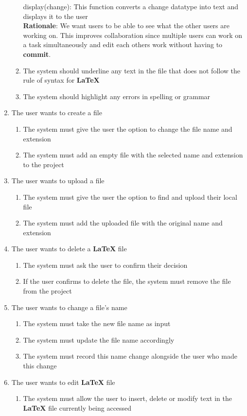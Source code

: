 \documentclass[12pt, titlepage]{article}
\begin{document}
\begin{enumerate}[{BE}1.]
\begin{enumerate}[resume*]
			display(change): This function converts a change datatype into text and displays it to the user\\
			\textbf{Rationale}: We want users to be able to see what the other users are working on. This improves collaboration since multiple users can work on a task simultaneously and edit each others work without having to \textbf{commit}.
			\item The system should underline any text in the file that does not follow the rule of syntax for \textbf{LaTeX}
			\item The system should highlight any errors in spelling or grammar
		\end{enumerate}
		\item The user wants to create a file
		\begin{enumerate}[resume*]\addtocounter{enumii}{1}
			\item The system must give the user the option to change the file name and extension
			\item The system must add an empty file with the selected name and extension to the project
		\end{enumerate}
		\item The user wants to upload a file
		\begin{enumerate}[resume*]
			\item The system must give the user the option to find and upload their local file
			\item The system must add the uploaded file with the original name and extension
		\end{enumerate}
		\item The user wants to delete a \textbf{LaTeX} file
		\begin{enumerate}[resume*]
			\item The system must ask the user to confirm their decision
			\item If the user confirms to delete the file, the system must remove the file from the project
		\end{enumerate}
		\item The user wants to change a file's name
		\begin{enumerate}[resume*]
			\item The system must take the new file name as input
			\item The system must update the file name accordingly
			\item The system must record this name change alongside the user who made this change
		\end{enumerate}
		\item The user wants to edit \textbf{LaTeX} file
		\begin{enumerate}[resume*]
			\item The system must allow the user to insert, delete or modify text in the \textbf{LaTeX} file currently being accessed\\
			

\end{enumerate}
\end{enumerate}
\end{document}
